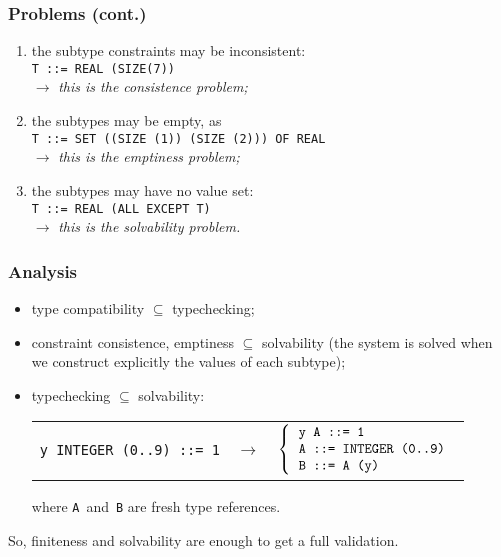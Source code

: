 \documentclass[compress,dvips,xcolor={dvipsnames},t]{beamer}
\newcounter{savedenum}
\newcommand*{\resume}{\setcounter{enumi}{\thesavedenum}}
\begin{document}
\begin{frame}
\frametitle{Problems (cont.)}

\begin{enumerate}

\resume

  \item \label{constraint_consistence} the subtype constraints may
        be inconsistent:\\
        \texttt{T ::= REAL (SIZE(7))}\\
        \(\rightarrow\) \emph{this is the consistence problem;}

  \item \label{subtype_non_emptyness} the subtypes may be empty, as\\
        \texttt{T ::= SET ((SIZE (1))  (SIZE (2))) OF REAL}\\
        \(\rightarrow\) \emph{this is the emptiness problem;}
   
  \item \label{solvability} the subtypes may have no value set:\\
        \texttt{T ::= REAL (ALL EXCEPT T)}\\
        \(\rightarrow\) \emph{this is the solvability problem.}

\end{enumerate}

\end{frame}

\begin{frame}
\frametitle{Analysis}

\begin{itemize}

  \item type compatibility $\subseteq$ typechecking;

  \item constraint consistence, emptiness $\subseteq$ solvability
        (the system is solved when we construct explicitly the values
        of each subtype);

  \item typechecking $\subseteq$ solvability:
\begin{tabular}{@{}r@{\;}c@{\;}l@{}}
   \texttt{y INTEGER (0..9) ::= 1}
   & $\rightarrow$ 
   & $\left\{
       \begin{tabular}{l} 
           \texttt{y A ::= 1} \\
           \texttt{A ::= INTEGER (0..9)} \\
           \texttt{B ::= A (y)}
        \end{tabular}
     \right.$
\end{tabular}
where \texttt{A}~and~\texttt{B} are fresh type references.

\end{itemize}

So, finiteness and solvability are enough to get a full validation.

\end{frame}
\end{document}

